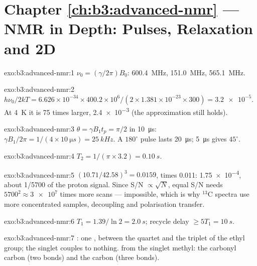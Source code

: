 \section*{Chapter \ref{ch:b3:advanced-nmr} --- NMR in Depth: Pulses, Relaxation and 2D}

\begin{solution}{exo:b3:advanced-nmr:1}
$\nu_0 = (\gamma/2\pi)B_0$:  \qty{600.4}{MHz},  \qty{151.0}{MHz}, 
\qty{565.1}{MHz}.
\end{solution}

\begin{solution}{exo:b3:advanced-nmr:2}
$h\nu_0/2kT = 6.626\times10^{-34} \times 400.2\times10^6/(2 \times 1.381\times10^{-23} \times 300)
= \num{3.2e-5}$. At \qty{4}{K} it is 75 times larger, \num{2.4e-3} (the approximation
still holds).
\end{solution}

\begin{solution}{exo:b3:advanced-nmr:3}
$\theta = \gamma B_1t_p = \pi/2$ in \qty{10}{\micro s}: $\gamma B_1/2\pi = 1/(4 \times
\qty{10}{\micro s}) = \qty{25}{kHz}$. A $180^\circ$ pulse lasts \qty{20}{\micro s}; \qty{5}{\micro s}
gives $45^\circ$.
\end{solution}

\begin{solution}{exo:b3:advanced-nmr:4}
$T_2 = 1/(\pi \times 3.2) = \qty{0.10}{s}$.
\end{solution}

\begin{solution}{exo:b3:advanced-nmr:5}
$(10.71/42.58)^3 = 0.0159$, times 0.011: \num{1.75e-4}, about 1/5700 of the proton
signal. Since S/N $\propto\sqrt N$, equal S/N needs $5700^2 \approx \num{3e7}$ times more
scans --- impossible, which is why ${}^{13}$C spectra use more concentrated samples,
decoupling and polarisation transfer.
\end{solution}

\begin{solution}{exo:b3:advanced-nmr:6}
$T_1 = 1.39/\ln2 = \qty{2.0}{s}$; recycle delay $\ge 5T_1 = \qty{10}{s}$.
\end{solution}

\begin{solution}{exo:b3:advanced-nmr:7}
: one , between the  quartet and the  triplet of the
ethyl group; the  singlet couples to nothing.  from the singlet methyl:
the carbonyl carbon (two bonds) and the  carbon (three bonds).
\end{solution}

